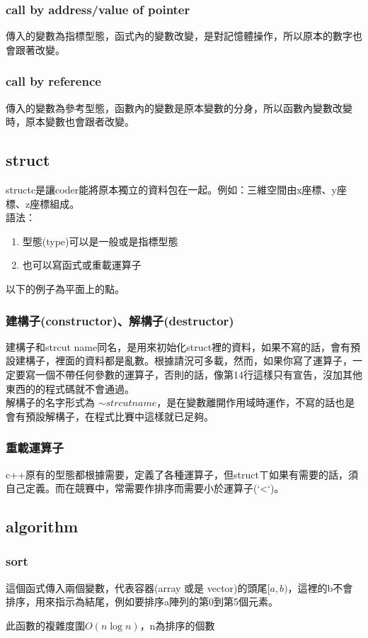 \subsubsection{call by address/value of pointer}
傳入的變數為指標型態，函式內的變數改變，是對記憶體操作，所以原本的數字也會跟著改變。

\subsubsection{call by reference}
傳入的變數為參考型態，函數內的變數是原本變數的分身，所以函數內變數改變時，原本變數也會跟者改變。

 \subsection{struct}
structc是讓coder能將原本獨立的資料包在一起。例如：三維空間由x座標、y座標、z座標組成。\\
語法：
\begin{enumerate}
\item 型態(type)可以是一般或是指標型態
\item 也可以寫函式或重載運算子
\end{enumerate}

以下的例子為平面上的點。

\subsubsection{建構子(constructor)、解構子(destructor)}
建構子和strcut name同名，是用來初始化struct裡的資料，如果不寫的話，會有預設建構子，裡面的資料都是亂數。根據請況可多載，然而，如果你寫了運算子，一定要寫一個不帶任何參數的運算子，否則的話，像第14行這樣只有宣告，沒加其他東西的的程式碼就不會通過。\\
解構子的名字形式為 $ \sim strcut name$，是在變數離開作用域時運作，不寫的話也是會有預設解構子，在程式比賽中這樣就已足夠。
\subsubsection{重載運算子}
c++原有的型態都根據需要，定義了各種運算子，但structㄒ如果有需要的話，須自己定義。而在競賽中，常需要作排序而需要小於運算子(`<`)。
\subsection{algorithm}
\subsubsection{sort}
這個函式傳入兩個變數，代表容器(array 或是 vector)的頭尾$[a,b)$，這裡的b不會排序，用來指示為結尾，例如要排序a陣列的第0到第5個元素。

此函數的複雜度圍$O(n\log n)$，n為排序的個數
